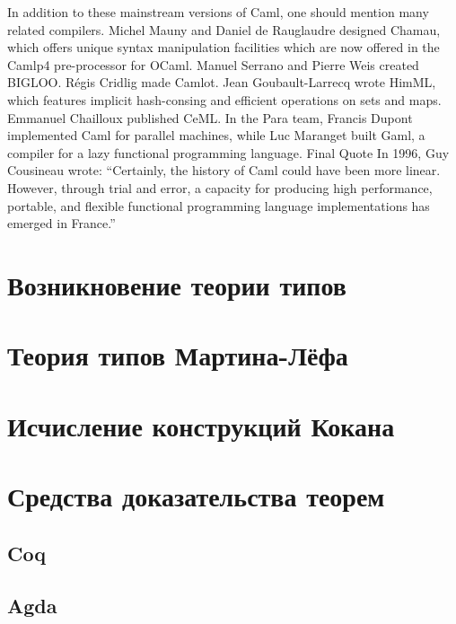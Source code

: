 \documentclass[14pt]{matmex-diploma-custom}
\begin{document}
In addition to these mainstream versions of Caml, one should mention many related compilers. Michel Mauny and Daniel de Rauglaudre designed Chamau, which offers unique syntax manipulation facilities which are now offered in the Camlp4 pre-processor for OCaml.
Manuel Serrano and Pierre Weis created BIGLOO. Régis Cridlig made Camlot. Jean Goubault-Larrecq wrote HimML, which features implicit hash-consing and efficient operations on sets and maps. Emmanuel Chailloux published CeML. In the Para team, Francis Dupont implemented Caml for parallel machines, while Luc Maranget built Gaml, a compiler for a lazy functional programming language.
Final Quote
In 1996, Guy Cousineau wrote: “Certainly, the history of Caml could have been more linear. However, through trial and error, a capacity for producing high performance, portable, and flexible functional programming language implementations has emerged in France.”


\newpage
\section{Возникновение теории типов}


\section{Теория типов Мартина-Лёфа}


\section{Исчисление конструкций Кокана}


\newpage
\section{Средства доказательства теорем}


\subsection{Coq}


\subsection{Agda}




\newpage
\end{document}
